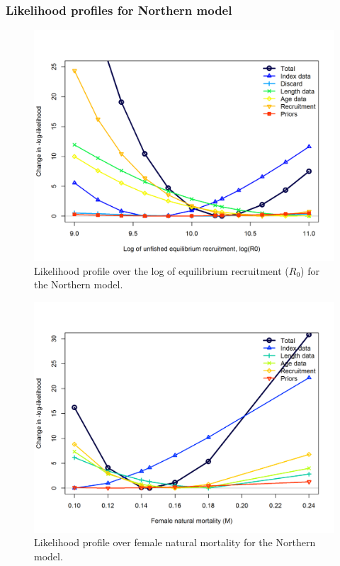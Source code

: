 \documentclass[12pt,]{article}
\begin{document}
\subsubsection{Likelihood profiles for Northern
model}\label{likelihood-profiles-for-northern-model}

\begin{figure}[htbp]
\centering
\includegraphics{Figures/profiles/profile_logR0.N.png}
\caption{Likelihood profile over the log of equilibrium recruitment
(\(R_0\)) for the Northern model. \label{fig:profile_logR0.N}}
\end{figure}

\FloatBarrier

\begin{figure}[htbp]
\centering
\includegraphics{Figures/profiles/profile_M.N.png}
\caption{Likelihood profile over female natural mortality for the
Northern model. \label{fig:profile_M.N}}
\end{figure}
\end{document}
